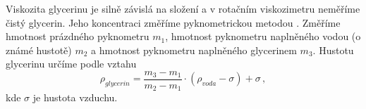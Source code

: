 Viskozita glycerinu je silně závislá na složení a v rotačním viskozimetru neměříme čistý glycerin.
Jeho koncentraci změříme pyknometrickou metodou \cite{pyknometr}.
Změříme hmotnost prázdného pyknometru $m_1$, hmotnost pyknometru naplněného vodou (o známé hustotě) $m_2$ a hmotnost pyknometru naplněného glycerinem $m_3$.
Hustotu glycerinu určíme podle vztahu \cite{skripta}
\begin{equation} \label{eq::pyknometr}
\rho_{glycerin} = \frac{m_3 - m_1}{m_2 - m_1} \cdot (\rho_{voda} - \sigma) + \sigma \,,
\end{equation}
kde $\sigma$ je hustota vzduchu.